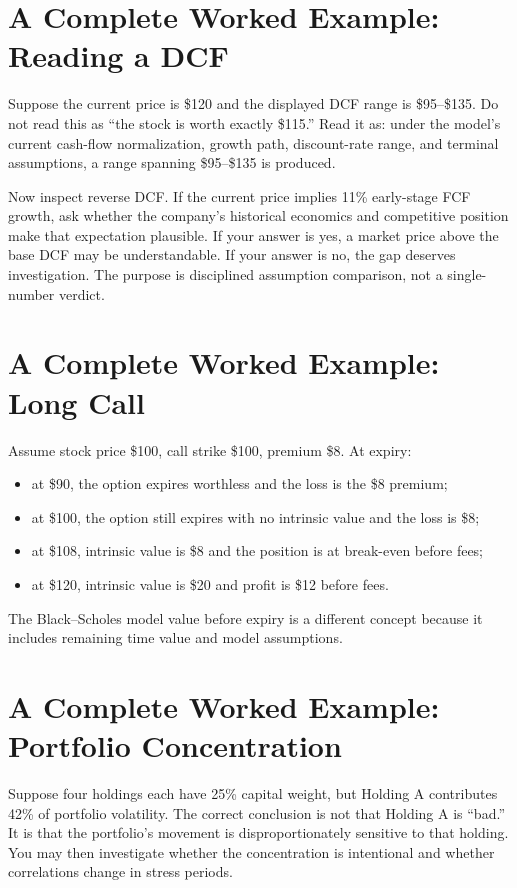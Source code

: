 \documentclass[11pt]{article}
\begin{document}
\section{A Complete Worked Example: Reading a DCF}
Suppose the current price is \$120 and the displayed DCF range is \$95--\$135. Do not read this as ``the stock is worth exactly \$115.'' Read it as: under the model's current cash-flow normalization, growth path, discount-rate range, and terminal assumptions, a range spanning \$95--\$135 is produced.

Now inspect reverse DCF. If the current price implies 11\% early-stage FCF growth, ask whether the company's historical economics and competitive position make that expectation plausible. If your answer is yes, a market price above the base DCF may be understandable. If your answer is no, the gap deserves investigation. The purpose is disciplined assumption comparison, not a single-number verdict.

\section{A Complete Worked Example: Long Call}
Assume stock price \$100, call strike \$100, premium \$8. At expiry:
\begin{itemize}[itemsep=0.15em]
\item at \$90, the option expires worthless and the loss is the \$8 premium;
\item at \$100, the option still expires with no intrinsic value and the loss is \$8;
\item at \$108, intrinsic value is \$8 and the position is at break-even before fees;
\item at \$120, intrinsic value is \$20 and profit is \$12 before fees.
\end{itemize}
The Black--Scholes model value before expiry is a different concept because it includes remaining time value and model assumptions.

\section{A Complete Worked Example: Portfolio Concentration}
Suppose four holdings each have 25\% capital weight, but Holding A contributes 42\% of portfolio volatility. The correct conclusion is not that Holding A is ``bad.'' It is that the portfolio's movement is disproportionately sensitive to that holding. You may then investigate whether the concentration is intentional and whether correlations change in stress periods.
\end{document}
